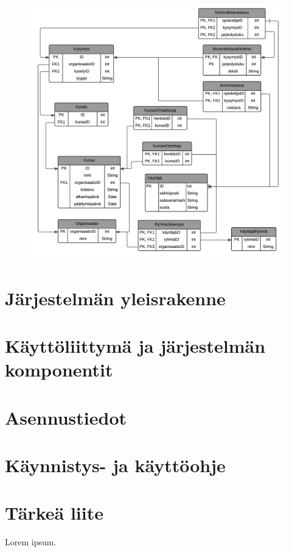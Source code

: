 \documentclass[12pt,a4paper,titlepage]{article}
\begin{document}
\begin{figure}
   \centering
   \includegraphics[width=\textwidth]{kuvat/relaatiokaavio-pysty.png}
   \caption{}\label{fig:krelaatiokaavio}
\end{figure}

\section{Järjestelmän yleisrakenne}

\section{Käyttöliittymä ja järjestelmän komponentit}

\section{Asennustiedot}

\section{Käynnistys- ja käyttöohje}




\small


\appendix
\section{Tärkeä liite}
Lorem ipsum.
\newpage
\end{document}

